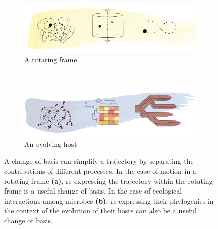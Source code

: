 \begin{figure}
    \centering
    \begin{subfigure}[b]{\textwidth}
        \includegraphics[width=\textwidth]{change_of_basis_a}
        \small
        \caption{A rotating frame}
    \end{subfigure}\\
    \begin{subfigure}[b]{\textwidth}
        \includegraphics[width=\textwidth]{change_of_basis_b}
        \small
        \caption{An evolving host}
    \end{subfigure}
    \caption{A change of basis can simplify a trajectory by separating the contributions of different processes. In the case of motion in a rotating frame \textbf{(a)}, re-expressing the trajectory within the rotating frame is a useful change of basis. In the case of ecological interactions among microbes \textbf{(b)}, re-expressing their phylogenies in the context of the evolution of their hosts can also be a useful change of basis. }
    \label{fig:intro_change_of_basis}
\end{figure}
